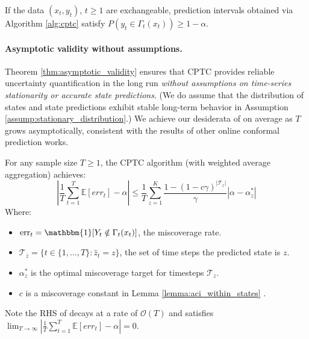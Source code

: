 \begin{proposition} If the data $(x_t, y_t)$, $t \geq 1$ are exchangeable, prediction intervals obtained via Algorithm \ref{alg:cptc} satisfy
\( P(y_t \in \Gamma_t(x_t)) \geq 1-\alpha\).
\label{prop:exchangable}
\end{proposition}

\vspace{-0.5em}
\paragraph{Asymptotic validity without assumptions.}
Theorem \ref{thm:asymptotic_validity} ensures that CPTC provides reliable uncertainty quantification in the long run \textit{without assumptions on time-series stationarity or accurate state predictions}. (We do assume that the distribution of states and state predictions exhibit stable long-term behavior in Assumption \ref{assump:stationary_distribution}.) We achieve our desiderata of  on average as $T$ grows asymptotically, consistent with the results of other online conformal prediction works. 

%
\begin{theorem} \label{thm:asymptotic_validity}
For any sample size \( T \geq 1 \), the CPTC algorithm (with weighted average aggregation) achieves:
\begin{equation*}
    \left| \frac{1}{T} \sum_{t=1}^T \mathbb{E}[err_t] - \alpha \right| \leq  \frac{1}{T} \sum_{z=1}^K  \frac{ 1 - (1-c\gamma)^{|\mathcal{T}_z|}  }{\gamma} |\alpha - \alpha^{*}_z|
    \label{eq:thm1}
\end{equation*}
Where:
\vspace{-4mm}
\begin{itemize}  \setlength{\itemsep}{0pt plus 1pt}
    \item \(\text{err}_t = \mathbbm{1}[Y_t \notin \Gamma_{t}(x_t)]\), the miscoverage rate. 
    \item \( \mathcal{T}_z = \{ t \in \{1, \dots, T\} : \hat{z}_t = z \} \), the set of time steps the predicted state is \( z \).
    \item $\alpha^*_z$ is the optimal miscoverage target for timesteps $\mathcal{T}_z$.
    \item  $c$ is a miscoverage constant in Lemma \ref{lemma:aci_within_states} \cite{gibbs2021adaptive}. 
\end{itemize}
\vspace{-0.5em}
Note the RHS of  decays at a rate of $\mathcal{O}(T)$ and satisfies
 \(
 \lim_{T \to \infty} \left| \frac{1}{T} \sum_{t=1}^T \mathbb{E}[err_t] - \alpha \right|= 0
 \).
\end{theorem}

